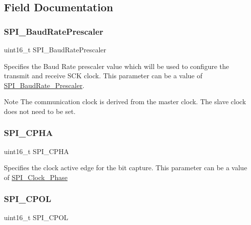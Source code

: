 \subsection{Field Documentation}
\mbox{\label{struct_s_p_i___init_type_def_a35b348a0ba5d3e9a8bc907a7ebe10d13}} 
\subsubsection{\texorpdfstring{SPI\_BaudRatePrescaler}{SPI\_BaudRatePrescaler}}
{\footnotesize\ttfamily uint16\+\_\+t S\+P\+I\+\_\+\+Baud\+Rate\+Prescaler}

Specifies the Baud Rate prescaler value which will be used to configure the transmit and receive S\+CK clock. This parameter can be a value of \mbox{\hyperlink{group___s_p_i___baud_rate___prescaler}{S\+P\+I\+\_\+\+Baud\+Rate\+\_\+\+Prescaler}}. \begin{DoxyNote}{Note}
The communication clock is derived from the master clock. The slave clock does not need to be set. 
\end{DoxyNote}
\mbox{\label{struct_s_p_i___init_type_def_a120f808113ce7d69e2ec1ea65abed627}} 
\subsubsection{\texorpdfstring{SPI\_CPHA}{SPI\_CPHA}}
{\footnotesize\ttfamily uint16\+\_\+t S\+P\+I\+\_\+\+C\+P\+HA}

Specifies the clock active edge for the bit capture. This parameter can be a value of \mbox{\hyperlink{group___s_p_i___clock___phase}{S\+P\+I\+\_\+\+Clock\+\_\+\+Phase}} \mbox{\label{struct_s_p_i___init_type_def_ae8d27aca088402c07e34e5a2ab4902d9}} 
\subsubsection{\texorpdfstring{SPI\_CPOL}{SPI\_CPOL}}
{\footnotesize\ttfamily uint16\+\_\+t S\+P\+I\+\_\+\+C\+P\+OL}

